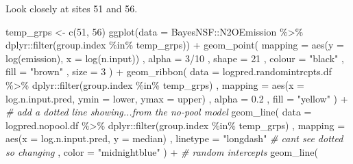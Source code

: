 \documentclass[
]{article}
\newenvironment{Shaded}{\begin{snugshade}}{\end{snugshade}}
\newcommand{\AttributeTok}[1]{\textcolor[rgb]{0.77,0.63,0.00}{#1}}
\newcommand{\CommentTok}[1]{\textcolor[rgb]{0.56,0.35,0.01}{\textit{#1}}}
\newcommand{\DecValTok}[1]{\textcolor[rgb]{0.00,0.00,0.81}{#1}}
\newcommand{\FloatTok}[1]{\textcolor[rgb]{0.00,0.00,0.81}{#1}}
\newcommand{\FunctionTok}[1]{\textcolor[rgb]{0.00,0.00,0.00}{#1}}
\newcommand{\NormalTok}[1]{#1}
\newcommand{\OtherTok}[1]{\textcolor[rgb]{0.56,0.35,0.01}{#1}}
\newcommand{\SpecialCharTok}[1]{\textcolor[rgb]{0.00,0.00,0.00}{#1}}
\newcommand{\StringTok}[1]{\textcolor[rgb]{0.31,0.60,0.02}{#1}}
\begin{document}
Look closely at sites 51 and 56.

\begin{Shaded}
\begin{Highlighting}[]
\NormalTok{temp\_grps }\OtherTok{\textless{}{-}} \FunctionTok{c}\NormalTok{(}\DecValTok{51}\NormalTok{, }\DecValTok{56}\NormalTok{)}
\FunctionTok{ggplot}\NormalTok{(}\AttributeTok{data =}\NormalTok{ BayesNSF}\SpecialCharTok{::}\NormalTok{N2OEmission }\SpecialCharTok{\%\textgreater{}\%}\NormalTok{ dplyr}\SpecialCharTok{::}\FunctionTok{filter}\NormalTok{(group.index }\SpecialCharTok{\%in\%}\NormalTok{ temp\_grps)) }\SpecialCharTok{+}
  \FunctionTok{geom\_point}\NormalTok{(}
    \AttributeTok{mapping =} \FunctionTok{aes}\NormalTok{(}\AttributeTok{y =} \FunctionTok{log}\NormalTok{(emission), }\AttributeTok{x =} \FunctionTok{log}\NormalTok{(n.input))}
\NormalTok{    , }\AttributeTok{alpha =} \DecValTok{3}\SpecialCharTok{/}\DecValTok{10}
\NormalTok{    , }\AttributeTok{shape =} \DecValTok{21}
\NormalTok{    , }\AttributeTok{colour =} \StringTok{"black"}
\NormalTok{    , }\AttributeTok{fill =} \StringTok{"brown"}
\NormalTok{    , }\AttributeTok{size =} \DecValTok{3}
\NormalTok{  ) }\SpecialCharTok{+}
  \FunctionTok{geom\_ribbon}\NormalTok{(}
    \AttributeTok{data =}\NormalTok{ logpred.randomintrcpts.df }\SpecialCharTok{\%\textgreater{}\%}\NormalTok{ dplyr}\SpecialCharTok{::}\FunctionTok{filter}\NormalTok{(group.index }\SpecialCharTok{\%in\%}\NormalTok{ temp\_grps)}
\NormalTok{    , }\AttributeTok{mapping =} \FunctionTok{aes}\NormalTok{(}\AttributeTok{x =}\NormalTok{ log.n.input.pred, }\AttributeTok{ymin =}\NormalTok{ lower, }\AttributeTok{ymax =}\NormalTok{ upper)}
\NormalTok{    , }\AttributeTok{alpha =} \FloatTok{0.2}
\NormalTok{    , }\AttributeTok{fill =} \StringTok{"yellow"}
\NormalTok{  ) }\SpecialCharTok{+}
  \CommentTok{\# add a dotted line showing...from the no{-}pool model}
  \FunctionTok{geom\_line}\NormalTok{(}
    \AttributeTok{data =}\NormalTok{ logpred.nopool.df }\SpecialCharTok{\%\textgreater{}\%}\NormalTok{ dplyr}\SpecialCharTok{::}\FunctionTok{filter}\NormalTok{(group.index }\SpecialCharTok{\%in\%}\NormalTok{ temp\_grps)}
\NormalTok{    , }\AttributeTok{mapping =} \FunctionTok{aes}\NormalTok{(}\AttributeTok{x =}\NormalTok{ log.n.input.pred, }\AttributeTok{y =}\NormalTok{ median)}
\NormalTok{    , }\AttributeTok{linetype =} \StringTok{"longdash"} \CommentTok{\# cant see dotted so changing }
\NormalTok{    , }\AttributeTok{color =} \StringTok{"midnightblue"}
\NormalTok{  ) }\SpecialCharTok{+}
  \CommentTok{\# random intercepts}
  \FunctionTok{geom\_line}\NormalTok{(}

\end{Highlighting}
\end{Shaded}
\end{document}
